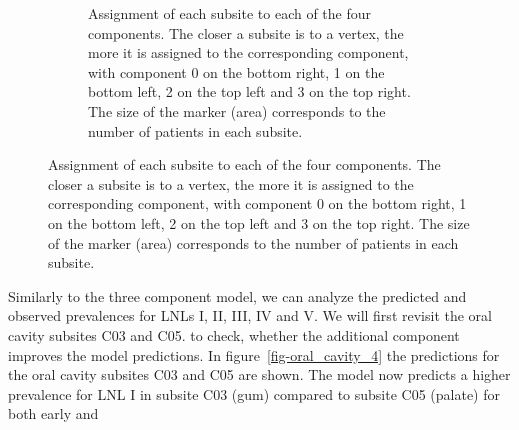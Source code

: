 \documentclass[
  sn-mathphys-num,
]{sn-jnl}
\begin{document}
\begin{figure}
\begin{minipage}{0.29\linewidth}
\begin{figure}[H]
\end{figure}%

\end{minipage}%
%
\begin{minipage}{0.71\linewidth}

\begin{figure}[H]


\caption{\label{fig-4_comp_scatter_uncert}Assignment of each subsite to
each of the four components. The closer a subsite is to a vertex, the
more it is assigned to the corresponding component, with component 0 on
the bottom right, 1 on the bottom left, 2 on the top left and 3 on the
top right. The size of the marker (area) corresponds to the number of
patients in each subsite.}

\end{figure}%

\end{minipage}%

\end{figure}%

Similarly to the three component model, we can analyze the predicted and
observed prevalences for LNLs I, II, III, IV and V. We will first
revisit the oral cavity subsites C03 and C05. to check, whether the
additional component improves the model predictions. In
figure~\ref{fig-oral_cavity_4} the predictions for the oral cavity
subsites C03 and C05 are shown. The model now predicts a higher
prevalence for LNL I in subsite C03 (gum) compared to subsite C05
(palate) for both early and
\end{document}
